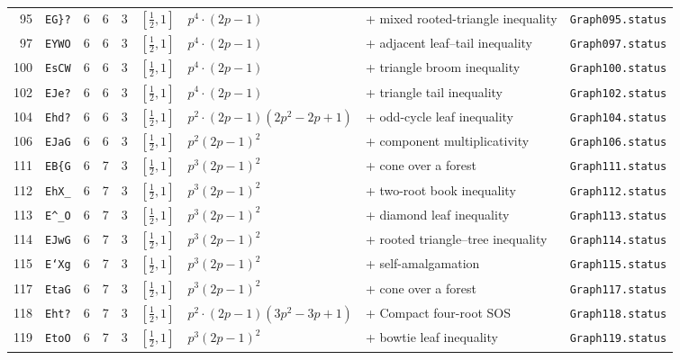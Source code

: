 \begin{landscape}
\begin{longtable}{r l r r r l p{4.0cm} p{3.5cm} p{2.7cm}}
95 & \texttt{EG\}?} & 6 & 6 & 3 & $[\frac{1}{2},1]$ & $p^{4} \cdot \left(2 p - 1\right)$ & + mixed rooted-triangle inequality & \texttt{Graph095.status}\\
97 & \texttt{EYWO} & 6 & 6 & 3 & $[\frac{1}{2},1]$ & $p^{4} \cdot \left(2 p - 1\right)$ & + adjacent leaf--tail inequality & \texttt{Graph097.status}\\
100 & \texttt{EsCW} & 6 & 6 & 3 & $[\frac{1}{2},1]$ & $p^{4} \cdot \left(2 p - 1\right)$ & + triangle broom inequality & \texttt{Graph100.status}\\
102 & \texttt{EJe?} & 6 & 6 & 3 & $[\frac{1}{2},1]$ & $p^{4} \cdot \left(2 p - 1\right)$ & + triangle tail inequality & \texttt{Graph102.status}\\
104 & \texttt{Ehd?} & 6 & 6 & 3 & $[\frac{1}{2},1]$ & $p^{2} \cdot \left(2 p - 1\right) \left(2 p^{2} - 2 p + 1\right)$ & + odd-cycle leaf inequality & \texttt{Graph104.status}\\
106 & \texttt{EJaG} & 6 & 6 & 3 & $[\frac{1}{2},1]$ & $p^{2} \left(2 p - 1\right)^{2}$ & + component multiplicativity & \texttt{Graph106.status}\\
111 & \texttt{EB\{G} & 6 & 7 & 3 & $[\frac{1}{2},1]$ & $p^{3} \left(2 p - 1\right)^{2}$ & + cone over a forest & \texttt{Graph111.status}\\
112 & \texttt{EhX\_} & 6 & 7 & 3 & $[\frac{1}{2},1]$ & $p^{3} \left(2 p - 1\right)^{2}$ & + two-root book inequality & \texttt{Graph112.status}\\
113 & \texttt{E\textasciicircum{}\_O} & 6 & 7 & 3 & $[\frac{1}{2},1]$ & $p^{3} \left(2 p - 1\right)^{2}$ & + diamond leaf inequality & \texttt{Graph113.status}\\
114 & \texttt{EJwG} & 6 & 7 & 3 & $[\frac{1}{2},1]$ & $p^{3} \left(2 p - 1\right)^{2}$ & + rooted triangle--tree inequality & \texttt{Graph114.status}\\
115 & \texttt{E`Xg} & 6 & 7 & 3 & $[\frac{1}{2},1]$ & $p^{3} \left(2 p - 1\right)^{2}$ & + self-amalgamation & \texttt{Graph115.status}\\
117 & \texttt{EtaG} & 6 & 7 & 3 & $[\frac{1}{2},1]$ & $p^{3} \left(2 p - 1\right)^{2}$ & + cone over a forest & \texttt{Graph117.status}\\
118 & \texttt{Eht?} & 6 & 7 & 3 & $[\frac{1}{2},1]$ & $p^{2} \cdot \left(2 p - 1\right) \left(3 p^{2} - 3 p + 1\right)$ & + Compact four-root SOS & \texttt{Graph118.status}\\
119 & \texttt{EtoO} & 6 & 7 & 3 & $[\frac{1}{2},1]$ & $p^{3} \left(2 p - 1\right)^{2}$ & + bowtie leaf inequality & \texttt{Graph119.status}\\

\end{longtable}
\end{landscape}
